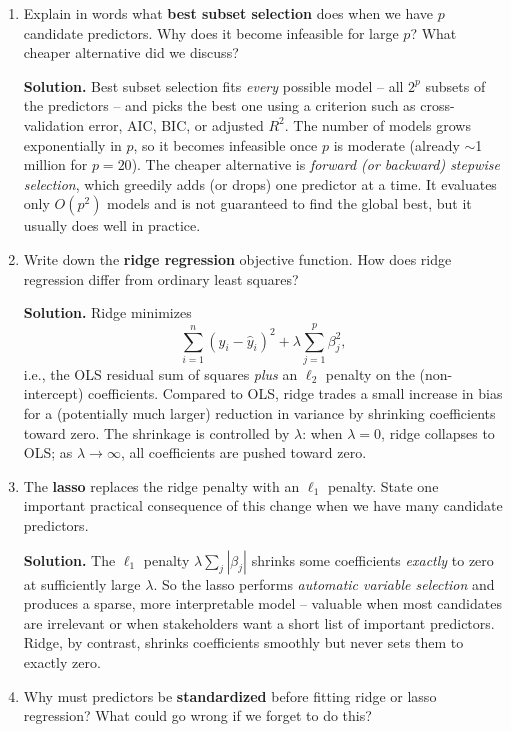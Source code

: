 \documentclass[11pt]{article}
\newcommand{\solution}[1]{%
  \par\medskip\noindent\textbf{Solution.} #1\par\medskip
}
\begin{document}
\begin{enumerate}[leftmargin=*, resume]

\item Explain in words what \textbf{best subset selection} does when we have $p$ candidate predictors. Why does it become infeasible for large $p$? What cheaper alternative did we discuss?

\solution{Best subset selection fits \emph{every} possible model -- all $2^p$ subsets of the predictors -- and picks the best one using a criterion such as cross-validation error, AIC, BIC, or adjusted $R^2$. The number of models grows exponentially in $p$, so it becomes infeasible once $p$ is moderate (already $\sim$1 million for $p=20$). The cheaper alternative is \emph{forward (or backward) stepwise selection}, which greedily adds (or drops) one predictor at a time. It evaluates only $O(p^2)$ models and is not guaranteed to find the global best, but it usually does well in practice.}

\item Write down the \textbf{ridge regression} objective function. How does ridge regression differ from ordinary least squares?

\solution{Ridge minimizes
$$\sum_{i=1}^n (y_i - \hat y_i)^2 + \lambda \sum_{j=1}^p \beta_j^2,$$
i.e., the OLS residual sum of squares \emph{plus} an $\ell_2$ penalty on the (non-intercept) coefficients. Compared to OLS, ridge trades a small increase in bias for a (potentially much larger) reduction in variance by shrinking coefficients toward zero. The shrinkage is controlled by $\lambda$: when $\lambda = 0$, ridge collapses to OLS; as $\lambda \to \infty$, all coefficients are pushed toward zero.}

\item The \textbf{lasso} replaces the ridge penalty with an $\ell_1$ penalty. State one important practical consequence of this change when we have many candidate predictors.

\solution{The $\ell_1$ penalty $\lambda \sum_j |\beta_j|$ shrinks some coefficients \emph{exactly} to zero at sufficiently large $\lambda$. So the lasso performs \emph{automatic variable selection} and produces a sparse, more interpretable model -- valuable when most candidates are irrelevant or when stakeholders want a short list of important predictors. Ridge, by contrast, shrinks coefficients smoothly but never sets them to exactly zero.}

\item Why must predictors be \textbf{standardized} before fitting ridge or lasso regression? What could go wrong if we forget to do this?


\end{enumerate}
\end{document}
